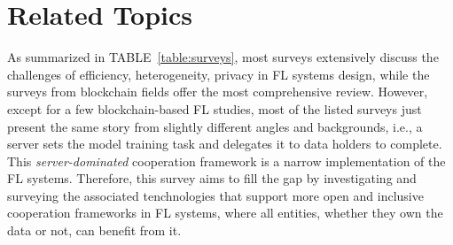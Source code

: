 \documentclass[journal]{IEEEtran}
\begin{document}
\section{Related Topics} %
\label{apdx:related}
As summarized in TABLE~\ref{table:surveys}, most surveys extensively discuss the challenges of efficiency, heterogeneity, privacy in FL systems design, while the surveys from blockchain fields offer the most comprehensive review.
However, except for a few blockchain-based FL studies, most of the listed surveys just present the same story from slightly different angles and backgrounds, i.e., a server sets the model training task and delegates it to data holders to complete. 
This \textit{server-dominated} cooperation framework is a narrow implementation of the FL systems.
Therefore, this survey aims to fill the gap by investigating and surveying the associated tenchnologies that support more open and inclusive cooperation frameworks in FL systems, where all entities, whether they own the data or not, can benefit from it. 
\end{document}
